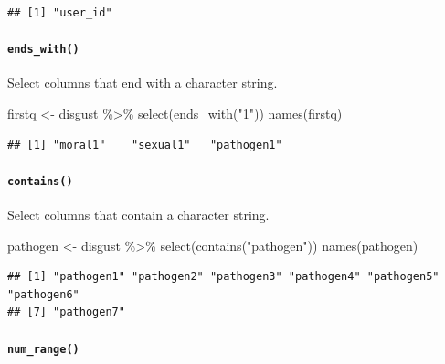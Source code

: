 \documentclass[
  oneside]{book}
\newenvironment{Shaded}{\begin{snugshade}}{\end{snugshade}}
\newcommand{\FunctionTok}[1]{\textcolor[rgb]{0.00,0.00,0.00}{#1}}
\newcommand{\NormalTok}[1]{#1}
\newcommand{\OtherTok}[1]{\textcolor[rgb]{0.56,0.35,0.01}{#1}}
\newcommand{\SpecialCharTok}[1]{\textcolor[rgb]{0.00,0.00,0.00}{#1}}
\newcommand{\StringTok}[1]{\textcolor[rgb]{0.31,0.60,0.02}{#1}}
\begin{document}
\begin{verbatim}
## [1] "user_id"
\end{verbatim}

\hypertarget{ends_with}{%
\paragraph{\texorpdfstring{\texttt{ends\_with()}}{ends\_with()}}\label{ends_with}}

Select columns that end with a character string.

\begin{Shaded}
\begin{Highlighting}[]
\NormalTok{firstq }\OtherTok{\textless{}{-}}\NormalTok{ disgust }\SpecialCharTok{\%\textgreater{}\%} \FunctionTok{select}\NormalTok{(}\FunctionTok{ends\_with}\NormalTok{(}\StringTok{"1"}\NormalTok{))}
\FunctionTok{names}\NormalTok{(firstq)}
\end{Highlighting}
\end{Shaded}

\begin{verbatim}
## [1] "moral1"    "sexual1"   "pathogen1"
\end{verbatim}

\hypertarget{contains}{%
\paragraph{\texorpdfstring{\texttt{contains()}}{contains()}}\label{contains}}

Select columns that contain a character string.

\begin{Shaded}
\begin{Highlighting}[]
\NormalTok{pathogen }\OtherTok{\textless{}{-}}\NormalTok{ disgust }\SpecialCharTok{\%\textgreater{}\%} \FunctionTok{select}\NormalTok{(}\FunctionTok{contains}\NormalTok{(}\StringTok{"pathogen"}\NormalTok{))}
\FunctionTok{names}\NormalTok{(pathogen)}
\end{Highlighting}
\end{Shaded}

\begin{verbatim}
## [1] "pathogen1" "pathogen2" "pathogen3" "pathogen4" "pathogen5" "pathogen6"
## [7] "pathogen7"
\end{verbatim}

\hypertarget{num_range}{%
\paragraph{\texorpdfstring{\texttt{num\_range()}}{num\_range()}}\label{num_range}}
\end{document}
